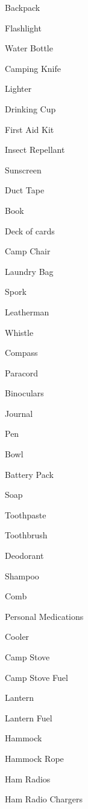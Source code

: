 \documentclass{article}
\begin{document}
\begin{multicols*}{3}
    \begin{packlist}
      \item Backpack
      \item Flashlight
      \item Water Bottle
      \item Camping Knife
      \item Lighter
      \item Drinking Cup
      \item First Aid Kit
      \item Insect Repellant
      \item Sunscreen
      \item Duct Tape
      \item Book
      \item Deck of cards
      \item Camp Chair
      \item Laundry Bag
      \item Spork
      \item Leatherman
      \item Whistle
      \item Compass
      \item Paracord
      \item Binoculars
      \item Journal
      \item Pen
      \item Bowl
      \item Battery Pack
    \end{packlist}


    \begin{packlist}
      \item Soap
      \item Toothpaste
      \item Toothbrush
      \item Deodorant
      \item Shampoo
      \item Comb
      \item Personal Medications
    \end{packlist}


    \begin{packlist}
      \item Cooler
      \item Camp Stove
      \item Camp Stove Fuel
      \item Lantern
      \item Lantern Fuel
      \item Hammock
      \item Hammock Rope
      \item Ham Radios
      \item Ham Radio Chargers
    \end{packlist}

  \end{multicols*}
\end{document}
